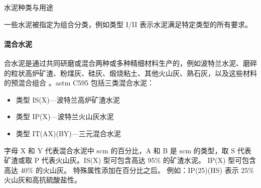 \begin{table}
  \caption{水泥种类与用途}\label{tab:cement-types}
  
\end{table}

一些水泥被指定为组合分类，例如类型 I/II 表示水泥满足特定类型的所有要求。

\paragraph{混合水泥}
合水泥是通过共同研磨或混合两种或多种精细材料生产的，例如波特兰水泥、磨碎的粒状高炉矿渣、粉煤灰、硅灰、煅烧粘土、其他火山灰、熟石灰，以及这些材料的预混合组合 \cite{kosmatka2011d}。\acrshort*{astm} C595 包括三类混合水泥：

\begin{itemize}
  \item 类型 IS(X)—波特兰高炉矿渣水泥
  \item 类型 IP(X)—波特兰火山灰水泥
  \item 类型 IT(AX)(BY)—三元混合水泥
\end{itemize}

字母 X 和 Y 代表混合水泥中 \gls*{scm} 的百分比，A 和 B 是 \gls*{scm} 的类型，取 S 代表矿渣或取 P 代表火山灰。IS(X) 型可包含高达 95\% 的矿渣水泥。 IP(X) 型可包含高达 40\% 的火山灰。 特殊属性添加在百分比之后。 例如：IP(25)(HS) 表示 25\% 火山灰和高抗硫酸盐性。

